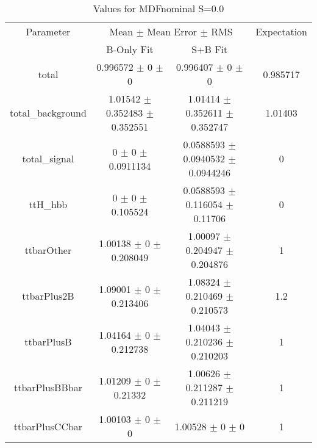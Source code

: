 \begin{table}
\centering
\caption{Values for MDFnominal S=0.0}
\begin{tabular}{cccc}
\toprule
Parameter & \multicolumn{2}{c}{Mean $\pm$ Mean Error $\pm$ RMS} & Expectation\\
 & B-Only Fit & S+B Fit & \\
\midrule
total & \num{0.996572} $\pm$ \num{0} $\pm$ \num{0} & \num{0.996407} $\pm$ \num{0} $\pm$ \num{0} & \num{0.985717}\\
total\_background & \num{1.01542} $\pm$ \num{0.352483} $\pm$ \num{0.352551} & \num{1.01414} $\pm$ \num{0.352611} $\pm$ \num{0.352747} & \num{1.01403}\\
total\_signal & \num{0} $\pm$ \num{0} $\pm$ \num{0.0911134} & \num{0.0588593} $\pm$ \num{0.0940532} $\pm$ \num{0.0944246} & \num{0}\\
ttH\_hbb & \num{0} $\pm$ \num{0} $\pm$ \num{0.105524} & \num{0.0588593} $\pm$ \num{0.116054} $\pm$ \num{0.11706} & \num{0}\\
ttbarOther & \num{1.00138} $\pm$ \num{0} $\pm$ \num{0.208049} & \num{1.00097} $\pm$ \num{0.204947} $\pm$ \num{0.204876} & \num{1}\\
ttbarPlus2B & \num{1.09001} $\pm$ \num{0} $\pm$ \num{0.213406} & \num{1.08324} $\pm$ \num{0.210469} $\pm$ \num{0.210573} & \num{1.2}\\
ttbarPlusB & \num{1.04164} $\pm$ \num{0} $\pm$ \num{0.212738} & \num{1.04043} $\pm$ \num{0.210236} $\pm$ \num{0.210203} & \num{1}\\
ttbarPlusBBbar & \num{1.01209} $\pm$ \num{0} $\pm$ \num{0.21332} & \num{1.00626} $\pm$ \num{0.211287} $\pm$ \num{0.211219} & \num{1}\\
ttbarPlusCCbar & \num{1.00103} $\pm$ \num{0} $\pm$ \num{0} & \num{1.00528} $\pm$ \num{0} $\pm$ \num{0} & \num{1}\\
\bottomrule
\end{tabular}
\end{table}